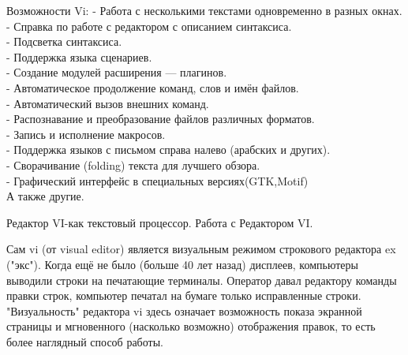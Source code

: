 \documentclass{beamer}
\begin{document}
\begin{frame}{Возможности Vi:}
- Работа с несколькими текстами одновременно в разных окнах.
\\
- Справка по работе с редактором с описанием синтаксиса.
\\
- Подсветка синтаксиса.
\\
- Поддержка языка сценариев.
\\
- Создание модулей расширения — плагинов.
\\
- Автоматическое продолжение команд, слов и имён файлов.
\\
- Автоматический вызов внешних команд.
\\
- Распознавание и преобразование файлов различных форматов.
\\
- Запись и исполнение макросов.
\\
- Поддержка языков с письмом справа налево (арабских и других).
\\
- Сворачивание (folding) текста для лучшего обзора.
\\
- Графический интерфейс в специальных версиях(GTK,Motif)
\\
А также другие.

\end{frame}
\begin{frame}{Редактор VI-как текстовый процессор. Работа с Редактором VI.}

Сам vi (от visual editor) является визуальным режимом строкового редактора ex ("экс"). Когда ещё не было (больше 40 лет назад) дисплеев, компьютеры выводили строки на печатающие терминалы. Оператор давал редактору команды правки строк, компьютер печатал на бумаге только исправленные строки. "Визуальность" редактора vi здесь означает возможность показа экранной страницы и мгновенного (насколько возможно) отображения правок, то есть более наглядный способ работы.
\end{frame}
\end{document}
